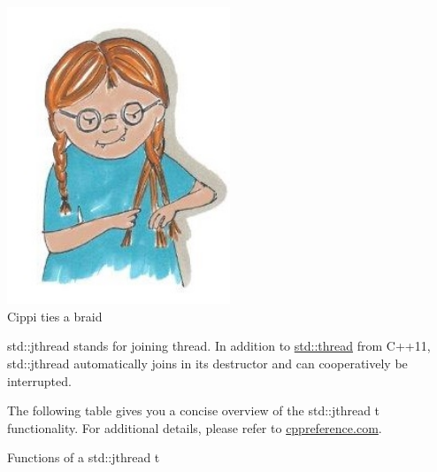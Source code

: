 \begin{center}
\includegraphics[width=0.5\textwidth]{content/3/chapter6/images/24.png}\\
Cippi ties a braid
\end{center}

std::jthread stands for joining thread. In addition to \href{https://en.cppreference.com/w/cpp/thread/thread}{std::thread} from C++11, std::jthread automatically joins in its destructor and can cooperatively be interrupted.

The following table gives you a concise overview of the std::jthread t functionality. For additional details, please refer to \href{https://en.cppreference.com/w/cpp/thread/jthread}{cppreference.com}.

\begin{center}
Functions of a std::jthread t
\end{center}

